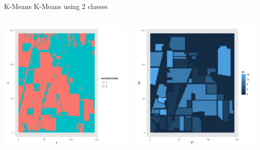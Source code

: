 \documentclass[11pt]{beamer}
\begin{document}
\begin{frame}{K-Means}
K-Means using 2 classes
\begin{columns}[T]
\begin{column}{.48\textwidth}
\includegraphics[scale=.3]{km2.png}
\end{column}
\hfill
\begin{column}{.48\textwidth}
\includegraphics[scale=.3]{gt.png}
\end{column}
\end{columns}
\end{frame}
\end{document}
